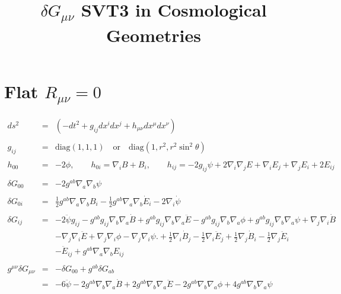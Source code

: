 \documentclass[10pt,letterpaper]{article}
\title{$\delta G_{\mu\nu}$ SVT3 in Cosmological Geometries}
\date{}
\numberwithin{equation}{section}
\begin{document}
 
\maketitle
\noindent 

\section{Flat $R_{\mu\nu} = 0$}
%

\begin{eqnarray}
ds^2 &=& (-dt^2 + g_{ij} dx^i dx^j + h_{\mu\nu} dx^\mu dx^\nu)
\\ \nonumber\\
g_{ij} &=& \text{diag}(1,1,1)\quad\text{or}\quad \text{diag}(1,r^2,r^2\sin^2\theta)
\\ \nonumber\\
h_{00} &=& -2\phi,\qquad h_{0i}= \nabla_i B + B_i,\qquad 
h_{ij} = -2 g_{ij}\psi + 2\nabla_i\nabla_j E + \nabla_i E_j + \nabla_j E_i + 2E_{ij}
\\ \nonumber\\
\delta G_{00} &=& -2 g^{ab}\nabla_{a}\nabla_{b}\psi
\\ \nonumber\\
\delta G_{0i} &=&\tfrac{1}{2} g^{ab} \nabla_{a}\nabla_{b}B_{i}
-  \tfrac{1}{2} g^{ab} \nabla_{a}\nabla_{b}\dot{E}_{i}
- 2 \nabla_{i}\dot{\psi}
\\ \nonumber\\
\delta G_{ij} &=&
-2 \ddot{\psi} g_{ij}
-  g^{ab} g_{ij} \nabla_{b}\nabla_{a}\dot{B}
+ g^{ab} g_{ij} \nabla_{b}\nabla_{a}\ddot{E}
-  g^{ab} g_{ij} \nabla_{b}\nabla_{a}\phi
+ g^{ab} g_{ij} \nabla_{b}\nabla_{a}\psi
+ \nabla_{j}\nabla_{i}\dot{B}\nonumber\\
&& -  \nabla_{j}\nabla_{i}\ddot{E}
+ \nabla_{j}\nabla_{i}\phi
-  \nabla_{j}\nabla_{i}\psi.
+\tfrac{1}{2} \nabla_{i}\dot{B}_{j}
-  \tfrac{1}{2} \nabla_{i}\ddot{E}_{j}
+ \tfrac{1}{2} \nabla_{j}\dot{B}_{i}
-  \tfrac{1}{2} \nabla_{j}\ddot{E}_{i}
\nonumber\\
&&- \ddot{E}_{ij}
+ g^{ab} \nabla_{a}\nabla_{b}E_{ij}
	\\ \nonumber\\
g^{\mu\nu}\delta G_{\mu\nu}&=& -\delta G_{00} + g^{ab}\delta G_{ab}
\nonumber\\
&=&-6 \ddot{\psi}
- 2 g^{ab} \nabla_{b}\nabla_{a}\dot{B}
+ 2 g^{ab} \nabla_{b}\nabla_{a}\ddot{E}
- 2 g^{ab} \nabla_{b}\nabla_{a}\phi
+ 4 g^{ab} \nabla_{b}\nabla_{a}\psi
\end{eqnarray}
%
%
\end{document}
